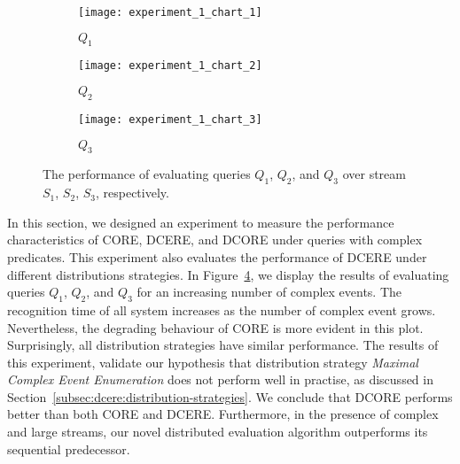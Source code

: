 \begin{figure}[t]
     \begin{adjustbox}{max width=1.3\linewidth,center}
     \centering
     \begin{subfigure}[b]{0.7\textwidth}
         \centering
         \texttt{[image: experiment\_1\_chart\_1]}
         \caption{$Q_{1}$}
         \label{fig:experiment:1:subfigure:1}
     \end{subfigure}
     \begin{subfigure}[b]{0.7\textwidth}
         \centering
         \texttt{[image: experiment\_1\_chart\_2]}
         \caption{$Q_{2}$}
         \label{fig:experiment:1:subfigure:2}
     \end{subfigure}
     \end{adjustbox}
     \begin{center}
      \begin{subfigure}[b]{0.7\textwidth}
          \centering
          \texttt{[image: experiment\_1\_chart\_3]}
          \caption{$Q_{3}$}
          \label{fig:experiment:1:subfigure:3}
      \end{subfigure}
     \end{center}
     \caption{The performance of evaluating queries $Q_{1}$, $Q_{2}$, and $Q_{3}$ over stream $S_{1}$, $S_{2}$, $S_{3}$, respectively.}
     \label{fig:experiment:1}
\end{figure}

In this section, we designed an experiment to measure the performance characteristics of CORE, DCERE, and DCORE under queries with complex predicates. This experiment also evaluates the performance of DCERE under different distributions strategies. In Figure~\ref{fig:experiment:1}, we display the results of evaluating queries $Q_{1}$, $Q_{2}$, and $Q_{3}$ for an increasing number of complex events. The recognition time of all system increases as the number of complex event grows. Nevertheless, the degrading behaviour of CORE is more evident in this plot. Surprisingly, all distribution strategies have similar performance. The results of this experiment, validate our hypothesis that distribution strategy \emph{Maximal Complex Event Enumeration} does not perform well in practise, as discussed in Section~\ref{subsec:dcere:distribution-strategies}. We conclude that DCORE performs better than both CORE and DCERE. Furthermore, in the presence of complex and large streams, our novel distributed evaluation algorithm outperforms its sequential predecessor.

